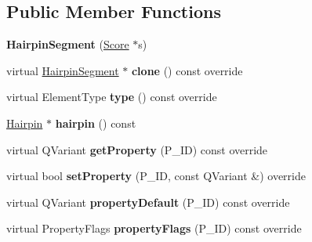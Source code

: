 \subsection*{Public Member Functions}
\begin{DoxyCompactItemize}
\item 
\mbox{\label{class_ms_1_1_hairpin_segment_a329e812e1b802ab4867fbf0f46a0927d}} 
{\bfseries Hairpin\+Segment} (\hyperlink{class_ms_1_1_score}{Score} $\ast$s)
\item 
\mbox{\label{class_ms_1_1_hairpin_segment_aaf591da45d6171dd82309eab624b38a0}} 
virtual \hyperlink{class_ms_1_1_hairpin_segment}{Hairpin\+Segment} $\ast$ {\bfseries clone} () const override
\item 
\mbox{\label{class_ms_1_1_hairpin_segment_a2d3556730c32cafab2473c6a3e57b67e}} 
virtual Element\+Type {\bfseries type} () const override
\item 
\mbox{\label{class_ms_1_1_hairpin_segment_a82c4f2784111249399e9c50137d4c38a}} 
\hyperlink{class_ms_1_1_hairpin}{Hairpin} $\ast$ {\bfseries hairpin} () const
\item 
\mbox{\label{class_ms_1_1_hairpin_segment_a3855882a9ebcd03c02ceb6259dc5bb4f}} 
virtual Q\+Variant {\bfseries get\+Property} (P\+\_\+\+ID) const override
\item 
\mbox{\label{class_ms_1_1_hairpin_segment_a81736008d1704a221d8cec974ea5564f}} 
virtual bool {\bfseries set\+Property} (P\+\_\+\+ID, const Q\+Variant \&) override
\item 
\mbox{\label{class_ms_1_1_hairpin_segment_a4cba0dcec9d131bd7769e2f891049395}} 
virtual Q\+Variant {\bfseries property\+Default} (P\+\_\+\+ID) const override
\item 
\mbox{\label{class_ms_1_1_hairpin_segment_a0336e644dbadeda0f79c6ec8b859b738}} 
virtual Property\+Flags {\bfseries property\+Flags} (P\+\_\+\+ID) const override
\item 
\mbox{\label{class_ms_1_1_hairpin_segment_ae832c1cc9e7c4a29dab03967ff3026f7}} 

\end{DoxyCompactItemize}

